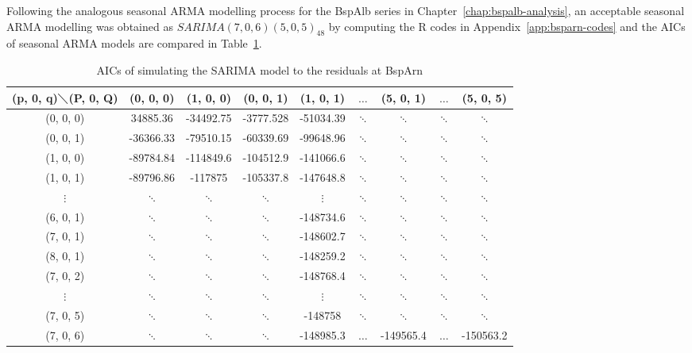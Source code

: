 \documentclass[12pt,msc]{uom_eee_dissertation_casson}
\newcommand{\tabref}[1]{Table~\ref{#1}}
\newcommand{\chapref}[1]{Chapter~\ref{#1}}
\newcommand{\appref}[1]{Appendix~\ref{#1}}
\begin{document}
Following the analogous seasonal ARMA modelling process for the BspAlb series in \chapref{chap:bspalb-analysis}, an acceptable seasonal ARMA modelling was obtained as $SARIMA(7,0,6)(5,0,5)_{48}$ by computing the R codes in \appref{app:bsparn-codes} and the AICs of seasonal ARMA models are compared in \tabref{table:5}.
\begin{table}[H]
\begin{tabular}{| c | c | c | c | c | c | c | c | c |}		\hline
		(p, 0, q)$\diagdown$(P, 0, Q)&(0, 0, 0)  &(1, 0, 0) &(0, 0, 1) &(1, 0, 1)& $\dots$   &(5, 0, 1)& $\dots$  &(5, 0, 5) \\ \hline
		(0, 0, 0)          &  34885.36 &  -34492.75 & -3777.528  & -51034.39  & $\ddots$ & $\ddots$  & $\ddots$ & $\ddots$ \\ \hline
		(0, 0, 1)          & -36366.33 &  -79510.15 & -60339.69  & -99648.96  & $\ddots$ & $\ddots$  & $\ddots$ & $\ddots$ \\ \hline
        (1, 0, 0)          & -89784.84 &  -114849.6 & -104512.9  & -141066.6   & $\ddots$ & $\ddots$  & $\ddots$ & $\ddots$ \\ \hline
		(1, 0, 1)          & -89796.86 & -117875    & -105337.8  &-147648.8   & $\ddots$ & $\ddots$  & $\ddots$ & $\ddots$ \\ \hline
        $\vdots$           & $\ddots$  & $\ddots$   & $\ddots$   & $\vdots$   & $\ddots$ & $\ddots$  & $\ddots$ & $\ddots$ \\ \hline
        (6, 0, 1)          & $\ddots$  & $\ddots$   & $\ddots$   &-148734.6   & $\ddots$ & $\ddots$  & $\ddots$ & $\ddots$ \\ \hline
		(7, 0, 1)          & $\ddots$  & $\ddots$   & $\ddots$   &-148602.7   & $\ddots$ & $\ddots$  & $\ddots$ & $\ddots$ \\ \hline
        (8, 0, 1)          & $\ddots$  & $\ddots$   & $\ddots$   &-148259.2   & $\ddots$ & $\ddots$  & $\ddots$ & $\ddots$ \\ \hline
        (7, 0, 2)          & $\ddots$  & $\ddots$   & $\ddots$   &-148768.4   & $\ddots$ & $\ddots$  & $\ddots$ & $\ddots$ \\ \hline
        $\vdots$           & $\ddots$  & $\ddots$   & $\ddots$   & $\vdots$   & $\ddots$ & $\ddots$  & $\ddots$ & $\ddots$ \\ \hline
		(7, 0, 5)          & $\ddots$  & $\ddots$   & $\ddots$   &-148758     & $\ddots$ & $\ddots$  & $\ddots$ & $\ddots$ \\ \hline
		(7, 0, 6)          & $\ddots$  & $\ddots$   & $\ddots$   &-148985.3   & $\dots$  &-149565.4  & $\dots$  & -150563.2 \\ \hline
	\end{tabular}
\caption{AICs of simulating the SARIMA model to the residuals at BspArn
    }
	\label{table:5}
\end{table}
\end{document}

